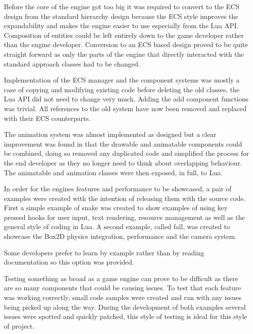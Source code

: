 \documentclass[11pt,a4paper,titlepage]{report}
\begin{document}
	
	Before the core of the engine got too big it was required to convert to the ECS design from the standard hierarchy design because the ECS style improves the expandability and makes the engine easier to use especially from the Lua API. Composition of entities could be left entirely down to the game developer rather than the engine developer. Conversion to an ECS based design proved to be quite straight forward as only the parts of the engine that directly interacted with the standard approach classes had to be changed.

	Implementation of the ECS manager and the component systems was mostly a case of copying and modifying existing code before deleting the old classes, the Lua API did not need to change very much. Adding the add component functions was trivial. All references to the old system have now been removed and replaced with their ECS counterparts.


	The animation system was almost implemented as designed but a clear improvement was found in that the drawable and animatable components could be combined, doing so removed any duplicated code and simplified the process for the end developer as they no longer need to think about overlapping behaviour. The animatable and animation classes were then exposed, in full, to Lua.


	In order for the engines features and performance to be showcased, a pair of examples were created with the intention of releasing them with the source code. First a simple example of snake was created to show examples of using key pressed hooks for user input, text rendering, resource management as well as the general style of coding in Lua. A second example, called fall, was created to showcase the Box2D physics integration, performance and the camera system.

	Some developers prefer to learn by example rather than by reading documentation so this option was provided.





	Testing something as broad as a game engine can prove to be difficult as there are so many components that could be causing issues. To test that each feature was working correctly, small code samples were created and ran with any issues being picked up along the way. During the development of both examples several issues were spotted and quickly patched, this style of testing is ideal for this style of project.
\end{document}

